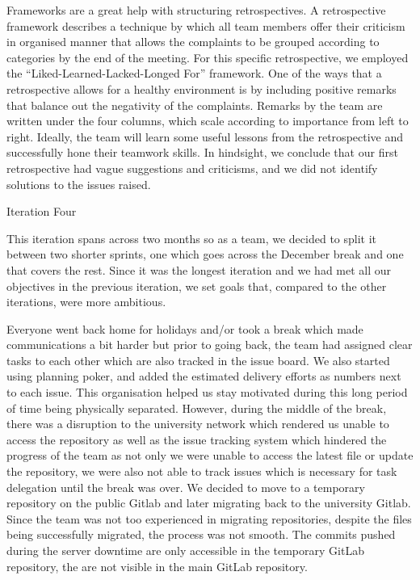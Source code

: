 \documentclass{l3proj}
\begin{document}
Frameworks are a great help with structuring retrospectives. A retrospective framework describes a technique by which all team members offer their criticism in organised manner that allows the complaints to be grouped according to categories by the end of the meeting. For this specific retrospective, we employed the “Liked-Learned-Lacked-Longed For” framework. One of the ways that a retrospective allows for a healthy environment is by including positive remarks that balance out the negativity of the complaints. Remarks by the team are written under the four columns, which scale according to importance from left to right. Ideally, the team will learn some useful lessons from the retrospective and successfully hone their teamwork skills. In hindsight, we conclude that our first retrospective had vague suggestions and criticisms, and we did not identify solutions to the issues raised.




Iteration Four

This iteration spans across two months so as a team, we decided to split it between two shorter sprints, one which goes across the December break and one that covers the rest. Since it was the longest iteration and we had met all our objectives in the previous iteration, we set goals that, compared to the other iterations, were more ambitious.

Everyone went back home for holidays and/or took a break which made communications a bit harder but prior to going back, the team had assigned clear tasks to each other which are also tracked in the issue board. We also started using planning poker, and added the estimated delivery efforts as numbers next to each issue. This organisation helped us stay motivated during this long period of time being physically separated. However, during the middle of the break, there was a disruption to the university network which rendered us unable to access the repository as well as the issue tracking system which hindered the progress of the team as not only we were unable to access the latest file or update the repository, we were also not able to track issues which is necessary for task delegation until the break was over. We decided to move to a temporary repository on the public Gitlab and later migrating back to the university Gitlab. Since the team was not too experienced in migrating repositories, despite the files being successfully migrated, the process was not smooth. The commits pushed during the server downtime are only accessible in the temporary GitLab repository, the are not visible in the main GitLab repository. 
\end{document}
